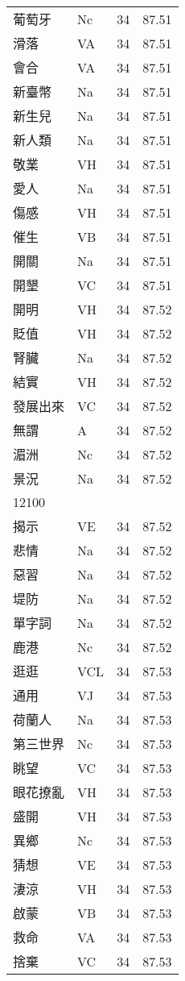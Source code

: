 \documentclass[twocolumn]{book}
\begin{document}
\begin{supertabular}{llrr}
葡萄牙 & Nc & 34 &  87.51\\
滑落 & VA & 34 &  87.51\\
會合 & VA & 34 &  87.51\\
新臺幣 & Na & 34 &  87.51\\
新生兒 & Na & 34 &  87.51\\
新人類 & Na & 34 &  87.51\\
敬業 & VH & 34 &  87.51\\
愛人 & Na & 34 &  87.51\\
傷感 & VH & 34 &  87.51\\
催生 & VB & 34 &  87.51\\
開關 & Na & 34 &  87.51\\
開墾 & VC & 34 &  87.51\\
開明 & VH & 34 &  87.52\\
貶值 & VH & 34 &  87.52\\
腎臟 & Na & 34 &  87.52\\
結實 & VH & 34 &  87.52\\
發展出來 & VC & 34 &  87.52\\
無謂 & A & 34 &  87.52\\
湄洲 & Nc & 34 &  87.52\\
景況 & Na & 34 &  87.52\\
12100\\
揭示 & VE & 34 &  87.52\\
悲情 & Na & 34 &  87.52\\
惡習 & Na & 34 &  87.52\\
堤防 & Na & 34 &  87.52\\
單字詞 & Na & 34 &  87.52\\
鹿港 & Nc & 34 &  87.52\\
逛逛 & VCL & 34 &  87.53\\
通用 & VJ & 34 &  87.53\\
荷蘭人 & Na & 34 &  87.53\\
第三世界 & Nc & 34 &  87.53\\
眺望 & VC & 34 &  87.53\\
眼花撩亂 & VH & 34 &  87.53\\
盛開 & VH & 34 &  87.53\\
異鄉 & Nc & 34 &  87.53\\
猜想 & VE & 34 &  87.53\\
淒涼 & VH & 34 &  87.53\\
啟蒙 & VB & 34 &  87.53\\
救命 & VA & 34 &  87.53\\
捨棄 & VC & 34 &  87.53\\

\end{supertabular}
\end{document}
